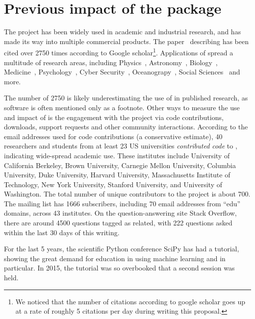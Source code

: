\section{Previous impact of the \sklearn{} package}
The \sklearn{} project has been widely used in academic and industrial research,
and has made its way into multiple commercial products. The
paper~\autocite{pedregosa2011scikit} describing \sklearn{} has been cited over 2750 times
according to Google scholar\footnote{We noticed that the number of citations
according to google scholar goes up at a rate of roughly 5 citations per day
during writing this proposal.}. Applications of \sklearn{} spread a multitude
of research areas, including Physics~\autocite{Baldi:2016fql, Yang:2016nnd},
Astronomy~\autocite{pereira2013spectrophotometric, bennett20141},
Biology~\autocite{misof2014phylogenomics, ritchie2014functional},
Medicine~\autocite{kamalov2015improving, ng2015computer},
Psychology~\autocite{park2015automatic,doehrmann2013predicting}, Cyber
Security~\autocite{sahs2012machine},
Oceanograpy~\autocite{sunagawa2015structure}, Social
Sciences~\autocite{driscoll2015searching, croicu2015improving} and more.

The number of 2750 is likely underestimating the use of \sklearn{} in published
research, as software is often mentioned only as a footnote.
Other ways to measure the use and impact of \sklearn{} is the engagement with
the project via code contributions, downloads, support requests and other
community interactions.
According to the email addresses used for code contributions (a conservative
estimate), 40 researchers and students from at least 23 US universities
\emph{contributed code} to \sklearn{}, indicating wide-spread academic use.
These institutes include University of California Berkeley, Brown University,
Carnegie Mellon University, Columbia University, Duke University, Harvard
University, Massachusetts Institute of Technology, New York University,
Stanford University, and University of Washington.
The total number of unique contributors to the project is about 700.
%
The \sklearn{} mailing list has 1666 subscribers, including 70 email
addresses from ``edu'' domains, across 43 institutes.
%
On the question-answering site Stack Overflow, there are around 4500 questions
tagged as \sklearn{} related, with 222 questions asked within the last 30
days of this writing.

For the last 5 years, the scientific Python conference SciPy has had a \sklearn{} tutorial,
showing the great demand for education in using machine learning and \sklearn{} in particular.
In 2015, the tutorial was so overbooked that a second session was held.

